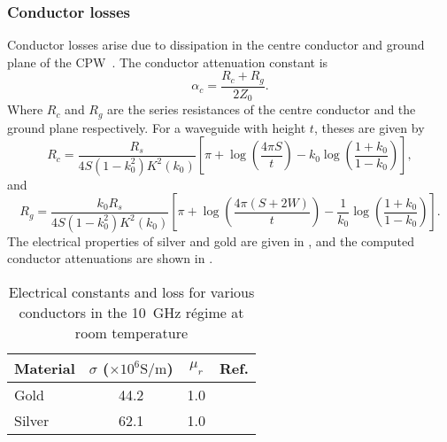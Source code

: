 \subsubsection{Conductor losses}

Conductor losses arise due to dissipation in the centre conductor and ground
plane of the CPW~\cite{Simons2004}.
The conductor attenuation constant is
\begin{equation}
  \alpha_c = \frac{R_c +R_g}{2Z_0}.
\end{equation}
Where $R_c$ and $R_g$ are the series resistances of the centre conductor and
the ground plane respectively.
For a waveguide with height 
$t$, theses are given by
\begin{equation}
  R_c = \frac{R_s}{4 S(1-k_0^2)K^2(k_0)}\left[ \pi + \log\left(\frac{4\pi
  S}{t}\right) - k_0\log\left(\frac{1+k_0}{1-k_0}\right) \right],
\end{equation}
and
\begin{equation}
  R_g = \frac{k_0 R_s}{4S(1-k_0^2)K^2(k_0)}\left[\pi +
  \log\left(\frac{4\pi(S+2W)}{t}\right) -
  \frac{1}{k_0}\log\left(\frac{1+k_0}{1-k_0}\right)\right].
\end{equation}
%
The electrical properties of silver and gold are given in
, and the computed conductor attenuations are
shown in .

% 
\begin{table}[ht]
  \caption{Electrical constants and loss for various conductors in the
  \SI{10}{\giga\hertz} r\'egime at room temperature}
\centering
\begin{tabular}{l c c c}
\hline\hline
Material & $\sigma$ ($\times10^6\si{\siemens\per\meter}$) & $\mu_r$ & Ref. \\ [ 0.5ex]
\hline
  Gold & 44.2 & 1.0 & \cite{edwards2016foundations}\\
  Silver & 62.1 & 1.0 & \cite{edwards2016foundations}\\
\hline
\end{tabular}
\label{mws:table:metalprops}
\end{table}

